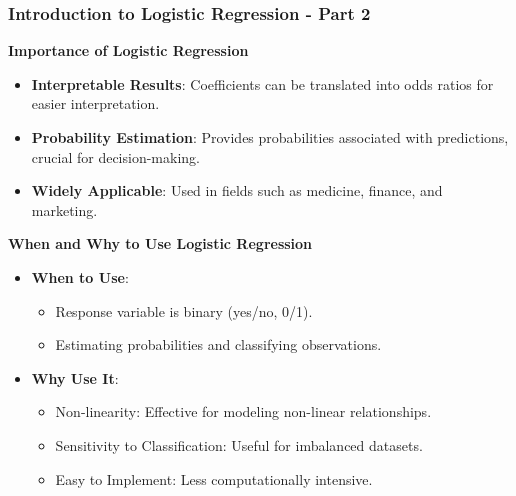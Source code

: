 \documentclass[aspectratio=169]{beamer}
\begin{document}
\begin{frame}[fragile]
    \frametitle{Introduction to Logistic Regression - Part 2}
    \textbf{Importance of Logistic Regression}

    \begin{itemize}
        \item \textbf{Interpretable Results}: Coefficients can be translated into odds ratios for easier interpretation.
        \item \textbf{Probability Estimation}: Provides probabilities associated with predictions, crucial for decision-making.
        \item \textbf{Widely Applicable}: Used in fields such as medicine, finance, and marketing.
    \end{itemize}
    
    \textbf{When and Why to Use Logistic Regression}
    
    \begin{itemize}
        \item \textbf{When to Use}:
            \begin{itemize}
                \item Response variable is binary (yes/no, 0/1).
                \item Estimating probabilities and classifying observations.
            \end{itemize}
        \item \textbf{Why Use It}:
            \begin{itemize}
                \item Non-linearity: Effective for modeling non-linear relationships.
                \item Sensitivity to Classification: Useful for imbalanced datasets.
                \item Easy to Implement: Less computationally intensive.
            \end{itemize}
    \end{itemize}
\end{frame}
\end{document}

